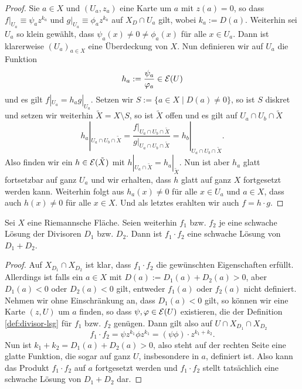 \begin{proof}
  Sie $a \in X$ und $(U_a, z_a)$ eine Karte um $a$ mit $z(a) = 0$, so
  dass $f|_{U_a} \equiv \psi_a z^{k_a}$ und $g|_{U_a} \equiv \phi_a
  z^{k_a}$ auf $X_D \cap U_a$ gilt, wobei $k_a := D(a)$. Weiterhin sei
  $U_a$ so klein gewählt, dass $\psi_a(x) \neq 0 \neq \phi_a(x)$ für
  alle $x \in U_a$. Dann ist klarerweise $(U_a)_{a \in X}$ eine
  Überdeckung von $X$. Nun definieren wir auf $U_a$ die Funktion
  \[
  h_a := \frac{\psi_a}{\varphi_a} \in \mathcal{E}(U)
  \]
  und es gilt $f|_{U_a} = h_a g|_{U_a}$. Setzen wir $S := \{ a \in X
  \mid D(a) \neq 0\}$, so ist $S$ diskret und setzen wir weiterhin
  $\tilde X = X \setminus S$, so ist $\tilde X$ offen und es gilt auf $U_a \cap U_b \cap
  \tilde X$
  \[
  h_a|_{U_a \cap U_b \cap \tilde X} = \frac{f|_{U_a \cap U_b \cap
      \tilde X}}{g|_{U_a \cap U_b \cap \tilde X}} = h_b|_{U_a \cap U_b
    \cap \tilde X}.
  \]
  Also finden wir ein $h \in \mathcal{E}(\tilde X)$ mit $h|_{U_a \cap \tilde
    X} = h_a|_{\tilde X}$. Nun ist aber $h_a$ glatt fortsetzbar auf
  ganz $U_a$ und wir erhalten, dass $h$ glatt auf ganz $X$ fortgesetzt
  werden kann. Weiterhin folgt aus $h_a(x) \neq 0$ für alle $x \in
  U_a$ und $a \in X$, dass auch $h(x) \neq 0$ für alle $x \in X$. Und
  als letztes erahlten wir auch $f = h \cdot g$.
\end{proof}

\begin{lemma}
  \label{lemma:lsg-produkt}
  Sei $X$ eine Riemannsche Fläche. Seien weiterhin $f_1$ bzw. $f_2$
  je eine schwache Lösung der Divisoren $D_1$ bzw. $D_2$. Dann ist
  $f_1 \cdot f_2$ eine schwache Lösung von $D_1 + D_2$.
\end{lemma}

\begin{proof}
  Auf $X_{D_1} \cap X_{D_2}$ ist klar, dass $f_1 \cdot f_2$ die
  gewünschten Eigenschaften erfüllt. Allerdings ist falls ein $a \in
  X$ mit $D(a) := D_1(a) +
  D_2(a) > 0$, aber $D_1(a) < 0$ oder $D_2(a) < 0$ gilt, entweder $f_1(a)$ oder
  $f_2(a)$ nicht definiert. Nehmen wir ohne Einschränkung an, dass
  $D_1(a) < 0$ gilt, so können wir eine Karte $(z,U)$ um $a$ finden,
  so dass $\psi, \varphi \in \mathcal{E}(U)$ existieren, die der Definition
  \ref{def:divisor-lsg} für $f_1$ bzw. $f_2$ genügen. Dann gilt also
  auf $U \cap X_{D_1} \cap X_{D_2}$
  \[
  f_1 \cdot f_2 = \psi z^{k_1} \phi z^{k_1} = (\psi \phi) \cdot
  z^{k_1+k_2}.
  \]
  Nun ist $k_1 + k_2 = D_1(a) + D_2(a) > 0$, also steht auf der
  rechten Seite eine glatte Funktion, die sogar auf ganz $U$,
  insbesondere in $a$, definiert ist. Also kann das Produkt $f_1 \cdot
  f_2$ auf $a$ fortgesetzt werden und $f_1 \cdot f_2$ stellt
  tatsächlich eine schwache Lösung von $D_1 + D_2$ dar.
\end{proof}

